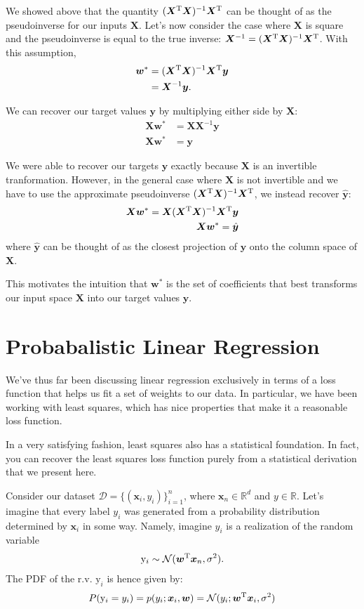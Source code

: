 We showed above that the quantity $(\bm{X}^{\mathrm T}\bm{X})^{-1}\bm{X}^{\mathrm T}$ can be thought of as the pseudoinverse for our inputs $\bm{X}$. Let's now consider the case where $\bm{X}$ is square and the pseudoinverse is equal to the true inverse: $\bm{X}^{-1} = (\bm{X}^{\mathrm T}\bm{X})^{-1}\bm{X}^{\mathrm T}$. With this assumption,
\begin{align*}
    \bm{w}^* &= (\bm{X}^{\mathrm T}\bm{X})^{-1}\bm{X}^{\mathrm T}\bm{y} \\
    &= \bm{X}^{-1}\bm{y}.
\end{align*}

We can recover our target values $\bm{y}$ by multiplying either side by $\bm{X}$:
\begin{align*}
    \bm{X}\bm{w}^* &= \bm{X}\bm{X}^{-1}\bm{y} \\
    \bm{X}\bm{w}^* &= \bm{y}
\end{align*}

We were able to recover our targets $\bm{y}$ exactly because $\bm{X}$ is an invertible tranformation. However, in the general case where $\bm{X}$ is not invertible and we have to use the approximate pseudoinverse $(\bm{X}^{\mathrm T}\bm{X})^{-1}\bm{X}^{\mathrm T}$, we instead recover $\hat{\bm{y}}$:
\begin{align*}
    \bm{X}\bm{w}^* = \bm{X}(\bm{X}^{\mathrm T}\bm{X})^{-1}\bm{X}^{\mathrm T}\bm{y} \\
    \bm{X}\bm{w}^* = \hat{\bm{y}}
\end{align*}
where $\hat{\bm{y}}$ can be thought of as the closest projection of $\bm{y}$ onto the column space of $\bm{X}$.

This motivates the intuition that $\bm{w}^*$ is the set of coefficients that best transforms our input space $\bm{X}$ into our target values $\bm{y}$.

\section{Probabalistic Linear Regression}
We've thus far been discussing linear regression exclusively in terms of a loss function that helps us fit a set of weights to our data. In particular, we have been working with least squares, which has nice properties that make it a reasonable loss function.

In a very satisfying fashion, least squares also has a statistical foundation. In fact, you can recover the least squares loss function purely from a statistical derivation that we present here.

Consider our dataset $\mathcal D = \{(\bm x_i, y_i)\}_{i = 1}^{n}$, where $\bm{x}_n \in\mathbb R^d$ and $y \in\mathbb{R}$. Let's imagine that every label $y_i$ was generated from a probability distribution determined by $\bm x_i$ in some way. Namely, imagine $y_i$ is a realization of the random variable
\begin{align*}
    \mathrm y_i \sim \mathcal{N}(\bm w^{\mathrm T} \bm x_n, \sigma^2).
\end{align*}
The PDF of the r.v. $\mathrm y_i$ is hence given by:
\begin{equation}
    \label{eq:normal-over-w}
    P(\mathrm y_i = y_i) = p(y_i; \bm x_i, \bm w) = \mathcal{N}(y_i; \bm w^{\mathrm T} \bm x_i, \sigma^2)
\end{equation}


